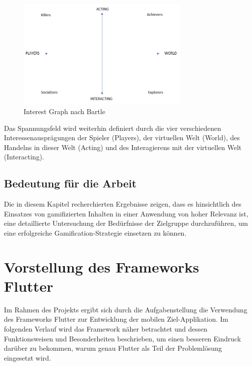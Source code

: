 \documentclass[bibliography=totoc,listof=totoc,BCOR=5mm,DIV=12,oneside]{scrbook}
\begin{document}
\bigskip
\begin{figure}[H]
	\centering
	\includegraphics[width=0.75\textwidth, keepaspectratio]{Bilder/Diagramme/InterestGraphBartle.png}
	\caption{Interest Graph nach Bartle \cite{bartle1996hearts}}
	\label{img:interetGraphBartle}
\end{figure}

\par \bigskip Das Spannungsfeld wird weiterhin definiert durch die vier verschiedenen Interessenausprägungen der Spieler (Players), der virtuellen Welt (World), des Handelns in dieser Welt (Acting) und des Interagierens mit der virtuellen Welt (Interacting).

\subsection{Bedeutung für die Arbeit}
\par Die in diesem Kapitel recherchierten Ergebnisse zeigen, dass es hinsichtlich des Einsatzes von gamifizierten Inhalten in einer Anwendung von hoher Relevanz ist, eine detaillierte Untersuchung der Bedürfnisse der Zielgruppe durchzuführen, um eine erfolgreiche Gamification-Strategie einsetzen zu können.

\newpage
\section{Vorstellung des Frameworks Flutter}
\label{chap:flutter}
\par Im Rahmen des Projekts ergibt sich durch die Aufgabenstellung die Verwendung des Frameworks Flutter zur Entwicklung der mobilen Ziel-Applikation. Im folgenden Verlauf wird das Framework näher betrachtet und dessen Funktionsweisen und Besonderheiten beschrieben, um einen besseren Eindruck darüber zu bekommen, warum genau Flutter als Teil der Problemlösung eingesetzt wird.
\end{document}
